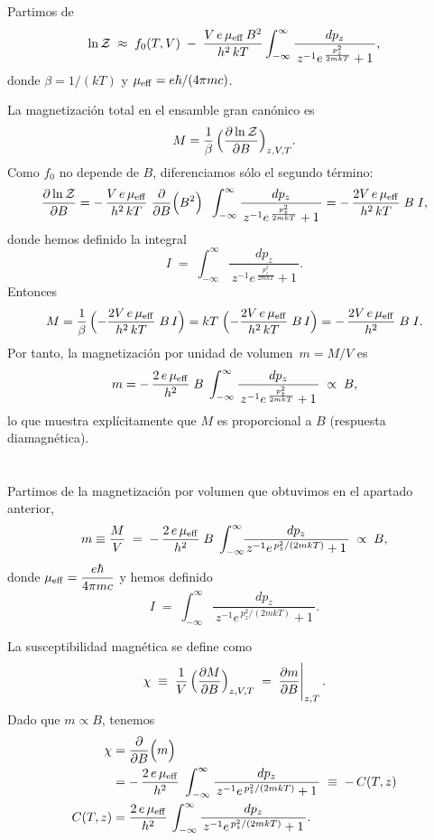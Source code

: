 \documentclass{report}
\begin{document}
\section{}

Partimos de
\[
\ln \mathcal{Z}
\;\approx\;
f_0(T,V)
\;-\;
\frac{V\,e\,\mu_{\rm eff}\,B^2}{h^2\,kT}
\int_{-\infty}^{\infty}
\frac{dp_z}{\,z^{-1}e^{\,\frac{p_z^2}{2mkT}}+1\,},
\]
donde \(\beta=1/(kT)\) y \(\mu_{\rm eff}=e\hbar/(4\pi m c)\).  

La magnetización total en el ensamble gran canónico es
\[
M
=\frac{1}{\beta}\,
\Bigl(\frac{\partial \ln \mathcal{Z}}{\partial B}\Bigr)_{z,V,T}.
\]
Como \(f_0\) no depende de \(B\), diferenciamos sólo el segundo término:
\[
\frac{\partial \ln \mathcal{Z}}{\partial B}
=
-\,\frac{V\,e\,\mu_{\rm eff}}{h^2\,kT}
\;\frac{\partial}{\partial B}\Bigl(B^2\Bigr)
\;\;
\int_{-\infty}^{\infty}
\frac{dp_z}{\,z^{-1}e^{\,\frac{p_z^2}{2mkT}}+1\,}
=
-\,\frac{2V\,e\,\mu_{\rm eff}}{h^2\,kT}\;B\;
I,
\]
donde hemos definido la integral
\[
I \;=\;\int_{-\infty}^{\infty}
\frac{dp_z}{\,z^{-1}e^{\,\frac{p_z^2}{2mkT}}+1\,}.
\]
Entonces
\[
M
=\frac{1}{\beta}\,
\Bigl(-\frac{2V\,e\,\mu_{\rm eff}}{h^2\,kT}\;B\,I\Bigr)
=
kT \;\Bigl(-\frac{2V\,e\,\mu_{\rm eff}}{h^2\,kT}\;B\,I\Bigr)
=
-\,\frac{2V\,e\,\mu_{\rm eff}}{h^2}\;B\;I.
\]
Por tanto, la magnetización por unidad de volumen 
\(\,m=M/V\) es
\[
m = -\,\frac{2\,e\,\mu_{\rm eff}}{h^2}\;B\;
\int_{-\infty}^{\infty}
\frac{dp_z}{\,z^{-1}e^{\,\frac{p_z^2}{2mkT}}+1\,}
\;\propto\; B,
\]
lo que muestra explícitamente que \(M\) es proporcional a \(B\) (respuesta diamagnética).

\section{}

Partimos de la magnetización por volumen que obtuvimos en el apartado anterior,
\[
m \equiv \frac{M}{V}
\;=\;
-\,\frac{2\,e\,\mu_{\rm eff}}{h^2}\;B\;
\int_{-\infty}^{\infty}\!\!
\frac{dp_z}{\,z^{-1}e^{\,p_z^2/(2mkT)}+1\,}
\;\propto\;B,
\]
donde 
\(\displaystyle \mu_{\rm eff}=\frac{e\hbar}{4\pi m c}\)
y hemos definido
\[
I \;=\;\int_{-\infty}^{\infty}
\frac{dp_z}{\,z^{-1}e^{\,p_z^2/(2mkT)}+1\,}.
\]

La susceptibilidad magnética se define como
\[
\chi \;\equiv\;\frac{1}{V}\,
\Bigl(\frac{\partial M}{\partial B}\Bigr)_{z,V,T}
\;=\;
\frac{\partial m}{\partial B}
\Bigg|_{z,T}\,.
\]
Dado que \(m\propto B\), tenemos
\begin{align*}
\chi
  &=\frac{\partial}{\partial B}\Bigl(m\Bigr)\\
  &=-\,\frac{2\,e\,\mu_{\rm eff}}{h^2}\;
\int_{-\infty}^{\infty}
\frac{dp_z}{\,z^{-1}e^{\,p_z^2/(2mkT)}+1\,}
\;\equiv\;
-\,C(T,z)\\
C(T,z)
  &=\frac{2\,e\,\mu_{\rm eff}}{h^2}\,
\int_{-\infty}^{\infty}
\frac{dp_z}{\,z^{-1}e^{\,p_z^2/(2mkT)}+1\,}.
\end{align*}
\end{document}
